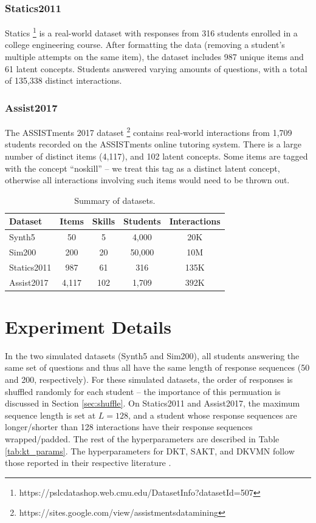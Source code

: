 \subsubsection*{Statics2011}
Statics \footnote{https://pslcdatashop.web.cmu.edu/DatasetInfo?datasetId=507} is a real-world dataset with responses from 316 students enrolled in a college engineering course. After formatting the data (removing a student's multiple attempts on the same item), the dataset includes 987 unique items and 61 latent concepts. Students answered varying amounts of questions, with a total of 135,338 distinct interactions.

\subsubsection*{Assist2017}
The ASSISTments 2017 dataset \footnote{https://sites.google.com/view/assistmentsdatamining} contains real-world interactions from 1,709 students recorded on the ASSISTments online tutoring system. There is a large number of distinct items (4,117), and 102 latent concepts. Some items are tagged with the concept ``noskill'' -- we treat this tag as a distinct latent concept, otherwise all interactions involving such items would need to be thrown out.

\begin{table}
  \centering
  \begin{tabular}{l c c c c}
    \hline
    Dataset & Items & Skills & Students & Interactions \\
    \hline
    Synth5 & 50 & 5 & 4,000 & 20K \\
    Sim200 & 200 & 20 & 50,000 & 10M \\
    Statics2011 & 987 & 61 & 316 & 135K \\
    Assist2017 & 4,117 & 102 & 1,709 & 392K \\
  \end{tabular}
  \caption{Summary of datasets.}
  \label{tab:kt_data}
\end{table}


\section*{Experiment Details}
In the two simulated datasets (Synth5 and Sim200), all students answering the same set of questions and thus all have the same length of response sequences (50 and 200, respectively). For these simulated datasets, the order of responses is shuffled randomly for each student -- the importance of this permuation is discussed in Section \ref{sec:shuffle}. On Statics2011 and Assist2017, the maximum sequence length is set at $L=128$, and a student whose response sequences are longer/shorter than 128 interactions have their response sequences wrapped/padded. The rest of the hyperparameters are described in Table \ref{tab:kt_params}. The hyperparameters for DKT, SAKT, and DKVMN follow those reported in their respective literature \cite{piech2015, pandey2019, zhang2017}.


